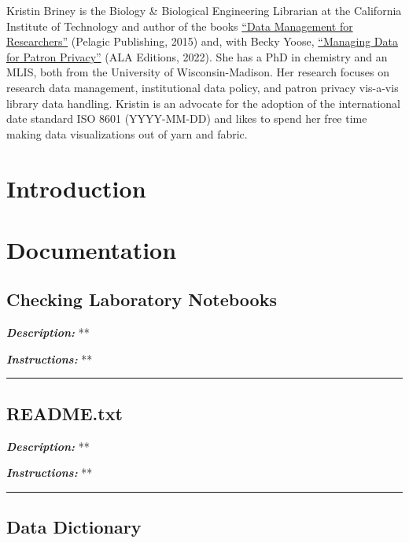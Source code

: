 \documentclass[
]{book}
\begin{document}
Kristin Briney is the Biology \& Biological Engineering Librarian at the California Institute of Technology and author of the books \href{https://pelagicpublishing.com/products/data-management-for-researchers-briney}{``Data Management for Researchers''} (Pelagic Publishing, 2015) and, with Becky Yoose, \href{https://www.alastore.ala.org/mdpp}{``Managing Data for Patron Privacy''} (ALA Editions, 2022). She has a PhD in chemistry and an MLIS, both from the University of Wisconsin-Madison. Her research focuses on research data management, institutional data policy, and patron privacy vis-a-vis library data handling. Kristin is an advocate for the adoption of the international date standard ISO 8601 (YYYY-MM-DD) and likes to spend her free time making data visualizations out of yarn and fabric.

\hypertarget{introduction}{%
\chapter{Introduction}\label{introduction}}

\hypertarget{documentation}{%
\chapter{Documentation}\label{documentation}}

\hypertarget{lab-notebook}{%
\section{Checking Laboratory Notebooks}\label{lab-notebook}}

\textbf{\emph{Description:}} **

\textbf{\emph{Instructions:}} **

\begin{center}\rule{0.5\linewidth}{0.5pt}\end{center}

\hypertarget{readme-txt}{%
\section{README.txt}\label{readme-txt}}

\textbf{\emph{Description:}} **

\textbf{\emph{Instructions:}} **

\begin{center}\rule{0.5\linewidth}{0.5pt}\end{center}

\hypertarget{data-dictionary}{%
\section{Data Dictionary}\label{data-dictionary}}
\end{document}
